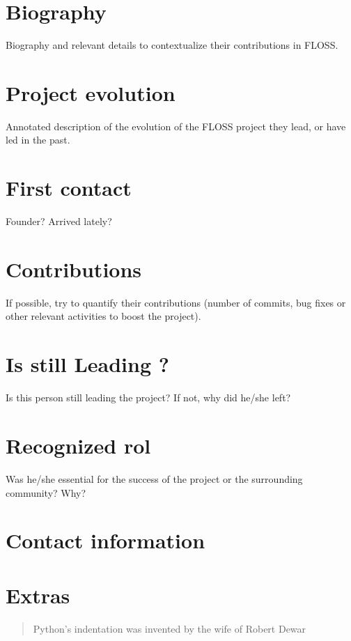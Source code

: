 \documentclass[11pt]{scrartcl}
\begin{document}
\section{Biography}

Biography and relevant details to contextualize their contributions in FLOSS.

\section{Project evolution}

Annotated description of the evolution of the FLOSS project they lead, or have led in the past.

\section{First contact}

Founder? Arrived lately?

\section{Contributions}

If possible, try to quantify their contributions (number of commits, bug fixes or other relevant activities to boost the project).

\section{Is still Leading ?}

Is this person still leading the project? If not, why did he/she left?

\section{Recognized rol}

Was he/she essential for the success of the project or the surrounding community? Why?

\section{Contact information}

\section{Extras}

\begin{quote}Python's indentation was invented by the wife of Robert Dewar\end{quote}
\end{document}

